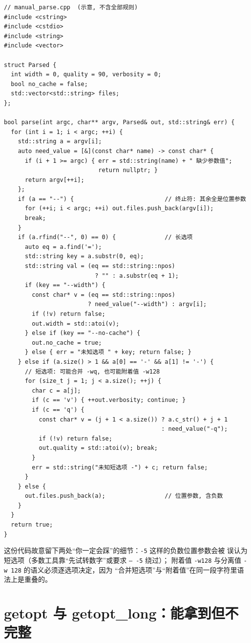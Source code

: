 \documentclass[12pt,a4paper,fontset=fandol]{ctexbook}
\newcommand{\Tp}[1]{\texttt{#1}}
\begin{document}
\begin{lstlisting}[caption={手写 argv 循环：能用的最小骨架}]
// manual_parse.cpp  (示意, 不含全部规则)
#include <cstring>
#include <cstdio>
#include <string>
#include <vector>

struct Parsed {
  int width = 0, quality = 90, verbosity = 0;
  bool no_cache = false;
  std::vector<std::string> files;
};

bool parse(int argc, char** argv, Parsed& out, std::string& err) {
  for (int i = 1; i < argc; ++i) {
    std::string a = argv[i];
    auto need_value = [&](const char* name) -> const char* {
      if (i + 1 >= argc) { err = std::string(name) + " 缺少参数值";
                           return nullptr; }
      return argv[++i];
    };
    if (a == "--") {                          // 终止符: 其余全是位置参数
      for (++i; i < argc; ++i) out.files.push_back(argv[i]);
      break;
    }
    if (a.rfind("--", 0) == 0) {              // 长选项
      auto eq = a.find('=');
      std::string key = a.substr(0, eq);
      std::string val = (eq == std::string::npos)
                          ? "" : a.substr(eq + 1);
      if (key == "--width") {
        const char* v = (eq == std::string::npos)
                        ? need_value("--width") : argv[i];
        if (!v) return false;
        out.width = std::atoi(v);
      } else if (key == "--no-cache") {
        out.no_cache = true;
      } else { err = "未知选项 " + key; return false; }
    } else if (a.size() > 1 && a[0] == '-' && a[1] != '-') {
      // 短选项: 可能合并 -wq, 也可能附着值 -w128
      for (size_t j = 1; j < a.size(); ++j) {
        char c = a[j];
        if (c == 'v') { ++out.verbosity; continue; }
        if (c == 'q') {
          const char* v = (j + 1 < a.size()) ? a.c_str() + j + 1
                                             : need_value("-q");
          if (!v) return false;
          out.quality = std::atoi(v); break;
        }
        err = std::string("未知短选项 -") + c; return false;
      }
    } else {
      out.files.push_back(a);                 // 位置参数, 含负数
    }
  }
  return true;
}
\end{lstlisting}

这份代码故意留下两处``你一定会踩''的细节：\Tp{-5} 这样的负数位置参数会被
误认为短选项（多数工具靠``先试转数字''或要求 \Tp{-- -5} 绕过）；
附着值 \Tp{-w128} 与分离值 \Tp{-w 128} 的语义必须逐选项决定，因为
``合并短选项''与``附着值''在同一段字符里语法上是重叠的。

\section{getopt 与 getopt\_long：能拿到但不完整}
\end{document}
